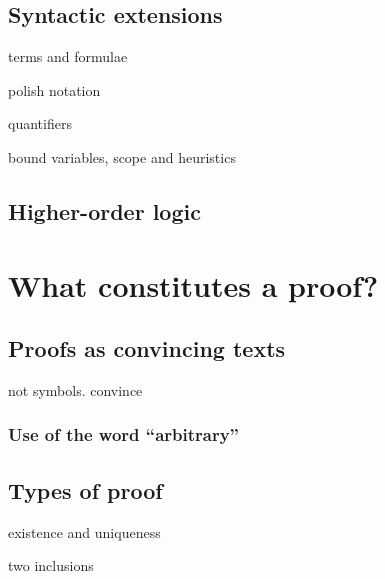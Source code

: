 \section{Syntactic extensions}
terms and formulae

polish notation

quantifiers

bound variables, scope and heuristics

\section{Higher-order logic}

\chapter{What constitutes a proof?}
\section{Proofs as convincing texts}
not symbols. convince
\subsection{Use of the word ``arbitrary''}
\section{Types of proof}
existence and uniqueness

two inclusions
